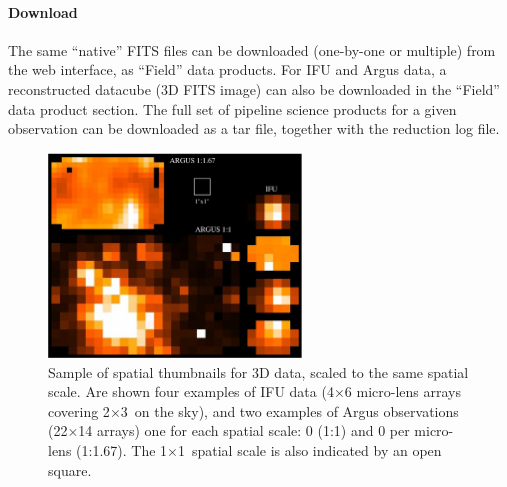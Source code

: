 \paragraph{Download} The same ``native'' FITS files can be downloaded (one-by-one or multiple) from the web interface, as ``Field'' data products. For IFU and Argus data, a reconstructed datacube (3D FITS image) can also be downloaded in the ``Field''  data product section. The full set of pipeline science products for a given observation can be downloaded as a tar file, together with the reduction log file. 

\begin{figure}[!ht]
\begin{center}
    \includegraphics[width=0.6\textwidth]{part6/Royer_P63/P63_f2.eps}
\end{center}
\caption{Sample of spatial thumbnails for 3D data, scaled to the same spatial scale. Are shown four examples of IFU data (4$\times$6 micro-lens arrays covering 2\arcsec$\times$3\arcsec\ on the sky), and two examples of Argus observations (22$\times$14 arrays) one for each spatial scale:  0 (1:1) and 0 per micro-lens (1:1.67). The 1\arcsec$\times$1\arcsec\ spatial scale is also indicated by an open square.}
\label{thumbnails}
\end{figure}

